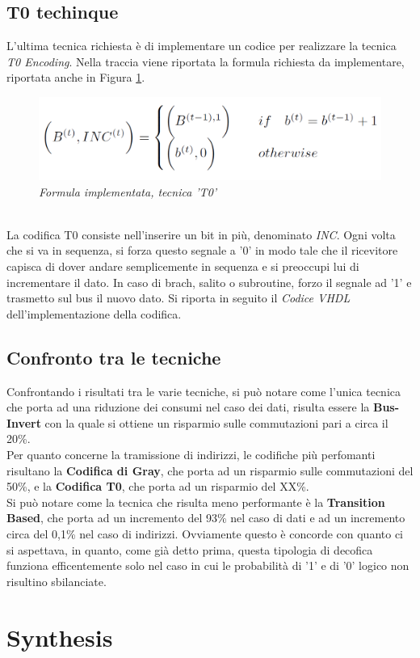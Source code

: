 \subsection{T0 techinque}
L'ultima tecnica richiesta è di implementare un codice per realizzare la tecnica \textit{T0 Encoding}. Nella traccia viene riportata la formula richiesta da implementare, riportata anche in Figura \ref{formula_t0}.\\
\begin{figure}[!htb]
	\centering
	\includegraphics[scale=0.8]{immagini/formula_t0}
	\caption{\textit{Formula implementata, tecnica 'T0'}}
	\label{formula_t0}
\end{figure}
\\
\noindent La codifica T0 consiste nell'inserire un bit in più, denominato \textit{INC}. Ogni volta che si va in sequenza, si forza questo segnale a '0' in modo tale che il ricevitore capisca di dover andare semplicemente in sequenza e si preoccupi lui di incrementare il dato. In caso di brach, salito o subroutine, forzo il segnale ad '1' e trasmetto sul bus il nuovo dato. Si riporta in seguito il \textit{Codice VHDL} dell'implementazione della codifica.

\subsection{Confronto tra le tecniche}
Confrontando i risultati tra le varie tecniche, si può notare come l'unica tecnica che porta ad una riduzione dei consumi nel caso dei dati, risulta essere la \textbf{Bus-Invert} con la quale si ottiene un risparmio sulle commutazioni pari a circa il 20\%. \\ %
Per quanto concerne la tramissione di indirizzi, le codifiche più perfomanti risultano la \textbf{Codifica di Gray}, che porta ad un risparmio sulle commutazioni del 50\%, e la \textbf{Codifica T0}, che porta ad un risparmio del XX\%.\\
Si può notare come la tecnica che risulta meno performante è la \textbf{Transition Based}, che porta ad un incremento del 93\% nel caso di dati e ad un incremento circa del 0,1\% nel caso di indirizzi. Ovviamente questo è concorde con quanto ci si aspettava, in quanto, come già detto prima, questa tipologia di decofica funziona efficentemente solo nel caso in cui le probabilità di '1' e di '0' logico non risultino sbilanciate.

\section{Synthesis}

